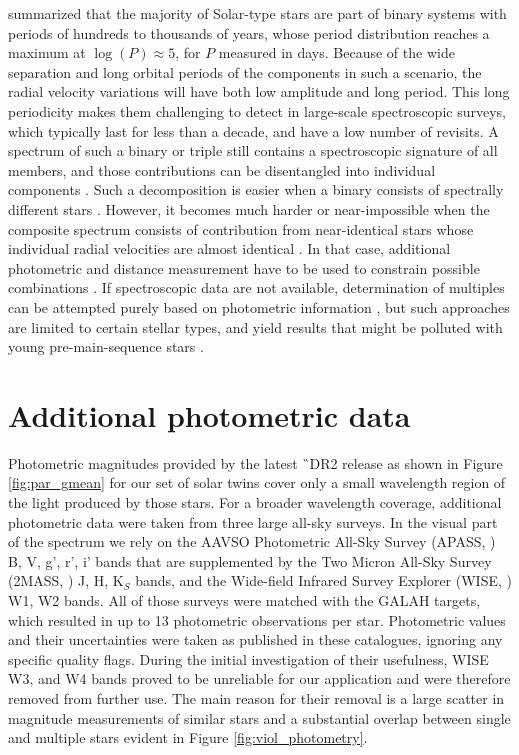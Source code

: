 \citet{2013ARA&A..51..269D} summarized that the majority of Solar-type stars are part of binary systems with periods of hundreds to thousands of years, whose period distribution reaches a maximum at $\log(P)\approx5$, for $P$ measured in days. Because of the wide separation and long orbital periods of the components in such a scenario, the radial velocity variations will have both low amplitude and long period. This long periodicity makes them challenging to detect in large-scale spectroscopic surveys, which typically last for less than a decade, and have a low number of revisits. A spectrum of such a binary or triple still contains a spectroscopic signature of all members, and those contributions can be disentangled into individual components \cite{2018MNRAS.473.5043E, 2018MNRAS.476..528E}. Such a decomposition is easier when a binary consists of spectrally different stars \cite{2005A&A...440..995S, 2007MNRAS.382.1377R, 2012MNRAS.419..806R, 2013AJ....146...82R, 2016MNRAS.458.3808R}. However, it becomes much harder or near-impossible when the composite spectrum consists of contribution from near-identical stars whose individual radial velocities are almost identical \cite{2015IJAsB..14..173B}. In that case, additional photometric and distance measurement have to be used to constrain possible combinations \cite{2018ApJ...857..114W}. If spectroscopic data are not available, determination of multiples can be attempted purely based on photometric information \cite{1997A&A...327..598F, 1998MNRAS.300..977H, 2016MNRAS.455.3009M, 2018ApJ...857..114W}, but such approaches are limited to certain stellar types, and yield results that might be polluted with young pre-main-sequence stars \cite{2018arXiv181010435Z}.

\section{Additional photometric data}
\label{sec:data_triples}
Photometric magnitudes provided by the latest \G\ DR2 release \cite{2016A&A...595A...1G, 2018A&A...616A...1G} as shown in Figure \ref{fig:par_gmean} for our set of solar twins cover only a small wavelength region of the light produced by those stars. For a broader wavelength coverage, additional photometric data were taken from three large all-sky surveys. In the visual part of the spectrum we rely on the AAVSO Photometric All-Sky Survey (APASS, \cite{2015AAS...22533616H}) B, V, g', r', i' bands that are supplemented by the Two Micron All-Sky Survey (2MASS, \cite{2006AJ....131.1163S}) J, H, K$_S$ bands, and the Wide-field Infrared Survey Explorer (WISE, \cite{2010AJ....140.1868W}) W1, W2 bands. All of those surveys were matched with the GALAH targets, which resulted in up to 13 photometric observations per star. Photometric values and their uncertainties were taken as published in these catalogues, ignoring any specific quality flags. During the initial investigation of their usefulness, WISE W3, and W4 bands proved to be unreliable for our application and were therefore removed from further use. The main reason for their removal is a large scatter in magnitude measurements of similar stars and a substantial overlap between single and multiple stars evident in Figure \ref{fig:viol_photometry}.


